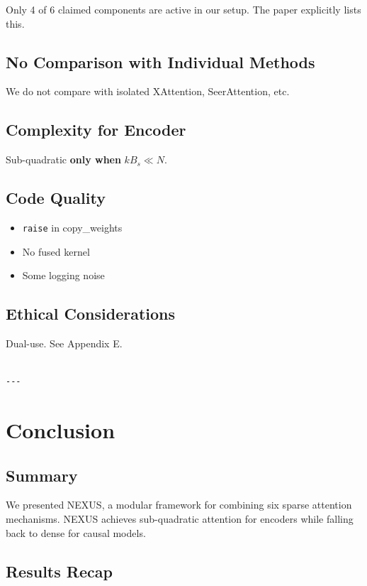 Only 4 of 6 claimed components are active in our setup. The paper 
explicitly lists this.

\subsection{No Comparison with Individual Methods}

We do not compare with isolated XAttention, SeerAttention, etc.

\subsection{Complexity for Encoder}

Sub-quadratic \textbf{only when} $k B_s \ll N$.

\subsection{Code Quality}

\begin{itemize}
\item \texttt{raise} in copy\_weights
\item No fused kernel
\item Some logging noise

\end{itemize}
\subsection{Ethical Considerations}

Dual-use. See Appendix E.
\begin{lstlisting}

---
\end{lstlisting}

\section{Conclusion}

\subsection{Summary}

We presented NEXUS, a modular framework for combining six sparse attention 
mechanisms. NEXUS achieves sub-quadratic attention for encoders while 
falling back to dense for causal models.

\subsection{Results Recap}

